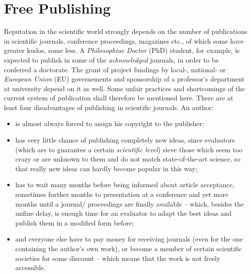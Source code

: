%
%
%
%
%
%
%

\section*{Free Publishing}
\label{free_publishing_heading}

Reputation in the scientific world strongly depends on the number of
publications in scientific journals, conference proceedings, magazines etc., of
which some have greater kudos, some less. A \emph{Philosophiae Doctor} (PhD)
student, for example, is expected to publish in some of the \emph{acknowledged}
journals, in order to be conferred a doctorate. The grant of project fundings
by local-, national- or \emph{European Union} (EU) governements and sponsorship
of a professor's department at university depend on it as well. Some unfair
practices and shortcomings of the current system of publication shall therefore
be mentioned here. There are at least four disadvantages of publishing in
scientific journals. An author:

\begin{itemize}
    \item is almost always forced to assign his copyright to the publisher;
    \item has very little chance of publishing completely new ideas, since
        evaluators (which are to guarantee a certain \emph{scientific level})
        sieve those which seem too crazy or are unknown to them and do not
        match state-of-the-art science, so that really new ideas can hardly
        become popular in this way;
    \item has to wait many months before being informed about article
        acceptance, sometimes further months to presentation at a conference
        and yet more months until a journal/ proceedings are finally available
        -- which, besides the unfine delay, is enough time for an evaluator to
        adapt the best ideas and publish them in a modified form before;
    \item and everyone else have to pay money for receiving journals (even for
        the one containing the author's own work), or become a member of
        certain scientific societies for some discount -- which means that the
        work is not freely accessible.
\end{itemize}

